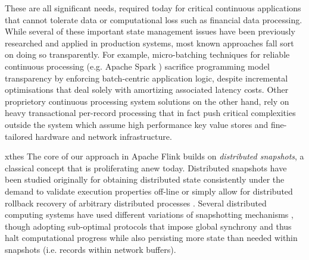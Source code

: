 These are all significant needs, required today for critical continuous applications that cannot tolerate data or computational loss such as financial data processing. 
 While several of these important state management issues have been previously researched and applied in production systems, most known approaches fall sort on doing so transparently. For example, micro-batching techniques for reliable continuous processing (e.g. Apache Spark \cite{zaharia2012discretized}) sacrifice programming model transparency by enforcing batch-centric application logic, despite incremental optimisations \cite{venkataramandrizzle} that deal solely with amortizing associated latency costs. Other proprietory continuous processing system solutions \cite{millwheel} on the other hand, rely on heavy transactional per-record processing that in fact push critical complexities outside the system which assume high performance key value stores and fine-tailored hardware and network infrastructure. 

xthes
The core of our approach in Apache Flink builds on \emph{distributed snapshots}, a  classical concept that is proliferating anew today. Distributed snapshots have been studied originally for obtaining distributed state consistently under the demand to validate execution properties off-line or simply allow for distributed rollback recovery of arbitrary distributed processes \cite{elnozahy2002survey}. Several distributed computing systems have used different variations of snapshotting mechanisms \cite{murray2013naiad,low2012distributed}, though adopting sub-optimal protocols that impose global synchrony and thus halt computational progress while also persisting more state than needed within snapshots (i.e. records within network buffers).



